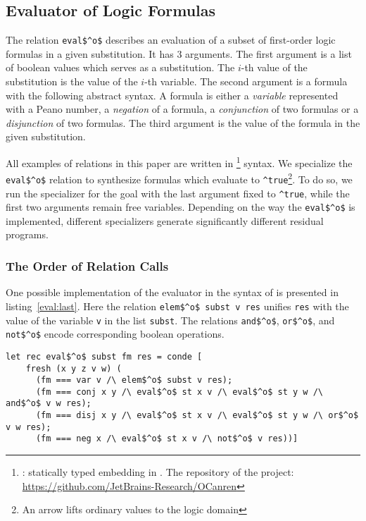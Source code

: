 \subsection{Evaluator of Logic Formulas}

The relation \lstinline{eval$^o$} describes an evaluation of a subset of first-order logic formulas in a given substitution.
It has 3 arguments.
The first argument is a list of boolean values which serves as a substitution.
The $i$-th value of the substitution is the value of the $i$-th variable.
The second argument is a formula with the following abstract syntax.
A formula is either a \emph{variable} represented with a Peano number, a \emph{negation} of a formula, a \emph{conjunction} of two formulas or a \emph{disjunction} of two formulas.
The third argument is the value of the formula in the given substitution.

All examples of \mk{} relations in this paper are written in \oc{}\footnote{\oc{}: statically typed \mk{} embedding in \ocaml{}. The repository of the project: \url{https://github.com/JetBrains-Research/OCanren}} syntax.
We specialize the \lstinline{eval$^o$} relation to synthesize formulas which evaluate to \lstinline{^true}\footnote{An arrow lifts ordinary values to the logic domain}.
To do so, we run the specializer for the goal with the last argument fixed to \lstinline{^true}, while the first two arguments remain free variables.
Depending on the way the \lstinline{eval$^o$} is implemented, different specializers generate significantly different residual programs.

\subsubsection{The Order of Relation Calls}

One possible implementation of the evaluator in the syntax of \oc{} is presented in listing~\ref{eval:last}.
Here the relation \lstinline{elem$^o$ subst v res} unifies \lstinline{res} with the value of the variable \lstinline{v} in the list \lstinline{subst}.
The relations \lstinline{and$^o$}, \lstinline{or$^o$}, and \lstinline{not$^o$} encode corresponding boolean operations.

\begin{figure*}[!h]
  \centering
  \begin{minipage}{0.95\textwidth}
    \begin{lstlisting}[label={eval:last}, caption={Evaluator of formulas with boolean operation last}, captionpos=b, frame=tb]
  let rec eval$^o$ subst fm res = conde [
    fresh (x y z v w) (
      (fm === var v /\ elem$^o$ subst v res);
      (fm === conj x y /\ eval$^o$ st x v /\ eval$^o$ st y w /\ and$^o$ v w res);
      (fm === disj x y /\ eval$^o$ st x v /\ eval$^o$ st y w /\ or$^o$ v w res);
      (fm === neg x /\ eval$^o$ st x v /\ not$^o$ v res))]
    \end{lstlisting}
  \end{minipage}
\end{figure*}

